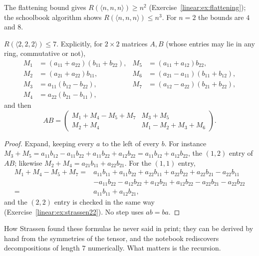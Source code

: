 The flattening bound gives $R(\langle n,n,n\rangle)\ge n^2$ (Exercise~\ref{linear:ex:flattening}); the schoolbook algorithm shows
$R(\langle n,n,n\rangle)\le n^3$. For $n=2$ the bounds are $4$ and $8$.

\begin{theorem}[Strassen, 1969]\label{linear:thm:strassen}
$R(\langle2,2,2\rangle)\le7$. Explicitly, for $2\times2$ matrices $A,B$ (whose entries may lie in any ring, commutative or not),
\[
\begin{aligned}
M_1&=(a_{11}+a_{22})(b_{11}+b_{22}),&M_5&=(a_{11}+a_{12})b_{22},\\
M_2&=(a_{21}+a_{22})b_{11},&M_6&=(a_{21}-a_{11})(b_{11}+b_{12}),\\
M_3&=a_{11}(b_{12}-b_{22}),&M_7&=(a_{12}-a_{22})(b_{21}+b_{22}),\\
M_4&=a_{22}(b_{21}-b_{11}),
\end{aligned}
\]
and then
\[
AB=\begin{pmatrix}M_1+M_4-M_5+M_7&M_3+M_5\\M_2+M_4&M_1-M_2+M_3+M_6\end{pmatrix}.
\]
\end{theorem}
\begin{proof}
Expand, keeping every $a$ to the left of every $b$. For instance $M_3+M_5=a_{11}b_{12}-a_{11}b_{22}+a_{11}b_{22}+a_{12}b_{22}=
a_{11}b_{12}+a_{12}b_{22}$, the $(1,2)$ entry of $AB$; likewise $M_2+M_4=a_{21}b_{11}+a_{22}b_{21}$. For the $(1,1)$ entry,
\[
\begin{aligned}
M_1+M_4-M_5+M_7={}&a_{11}b_{11}+a_{11}b_{22}+a_{22}b_{11}+a_{22}b_{22}+a_{22}b_{21}-a_{22}b_{11}\\
&-a_{11}b_{22}-a_{12}b_{22}+a_{12}b_{21}+a_{12}b_{22}-a_{22}b_{21}-a_{22}b_{22}\\
={}&a_{11}b_{11}+a_{12}b_{21},
\end{aligned}
\]
and the $(2,2)$ entry is checked in the same way (Exercise~\ref{linear:ex:strassen22}). No step uses $ab=ba$.
\end{proof}

How Strassen found these formulas he never said in print; they can be derived by hand from the symmetries of the tensor, and
the notebook rediscovers decompositions of length $7$ numerically. What matters is the recursion.

